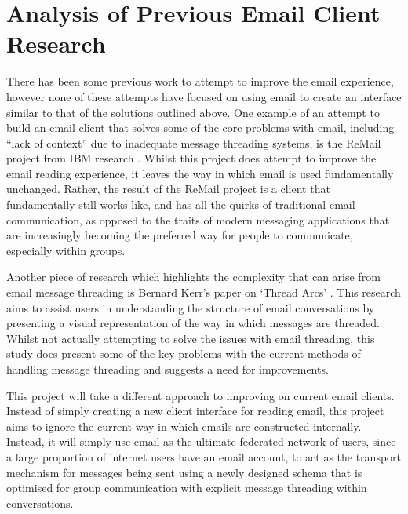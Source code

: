 \section{Analysis of Previous Email Client Research}

There has been some previous work to attempt to improve the email experience, however none of these attempts have focused on using email to create an interface similar to that of the solutions outlined above. One example of an attempt to build an email client that solves some of the core problems with email, including ``lack of context'' due to inadequate message threading systems, is the ReMail project from IBM research \cite{kerr2004designing}. Whilst this project does attempt to improve the email reading experience, it leaves the way in which email is used fundamentally unchanged. Rather, the result of the ReMail project is a client that fundamentally still works like, and has all the quirks of traditional email communication, as opposed to the traits of modern messaging applications that are increasingly becoming the preferred way for people to communicate, especially within groups.

Another piece of research which highlights the complexity that can arise from email message threading is Bernard Kerr's paper on `Thread Arcs' \cite{kerr2003thread}. This research aims to assist users in understanding the structure of email conversations by presenting a visual representation of the way in which messages are threaded. Whilst not actually attempting to solve the issues with email threading, this study does present some of the key problems with the current methods of handling message threading and suggests a need for improvements.

This project will take a different approach to improving on current email clients. Instead of simply creating a new client interface for reading email, this project aims to ignore the current way in which emails are constructed internally. Instead, it will simply use email as the ultimate federated network of users, since a large proportion of internet users have an email account, to act as the transport mechanism for messages being sent using a newly designed schema that is optimised for group communication with explicit message threading within conversations.
